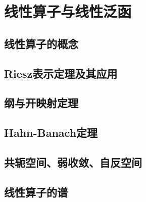 \documentclass[12pt,a4paper]{article}
\begin{document}
\newpage
\section{线性算子与线性泛函}
\subsection{线性算子的概念}
\subsection{Riesz表示定理及其应用}
\subsection{纲与开映射定理}
\subsection{Hahn-Banach定理}
\subsection{共轭空间、弱收敛、自反空间}
\subsection{线性算子的谱}
\end{document}

